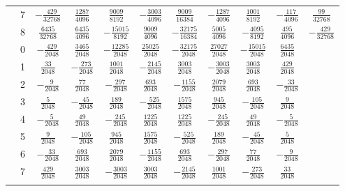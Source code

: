 \begin{table}
\begin{center}
\begin{tabular}{ccccccccccc}
         &  7  &  $-\frac{ 429}{32768}$  &    $ \frac{1287}{4096}$  &  $ \frac{ 9009}{8192}$  &  $-\frac{  3003}{4096}$  & $ \frac{  9009}{16384}$  &  $-\frac{  1287}{ 4096}$  &  $ \frac{  1001}{8192}$  & $-\frac{   117}{ 4096}$  &  $ \frac{    99}{32768}$ \\ \addlinespace
         &  8  &  $ \frac{6435}{32768}$  &    $ \frac{6435}{4096}$  &  $-\frac{15015}{8192}$  &  $ \frac{  9009}{4096}$  & $-\frac{ 32175}{16384}$  &  $ \frac{  5005}{ 4096}$  &  $-\frac{  4095}{8192}$  & $ \frac{   495}{ 4096}$  &  $-\frac{   429}{32768}$ \\ \addlinespace
      8  &  0  &  $-\frac{429}{2048}$  &  $ \frac{3465}{2048}$  &  $-\frac{12285}{2048}$  &  $ \frac{25025}{2048}$  &  $-\frac{32175}{2048}$  &  $ \frac{27027}{2048}$  &  $-\frac{15015}{2048}$  &  $ \frac{6435}{2048}$ \\ \addlinespace
         &  1  &  $ \frac{ 33}{2048}$  &  $-\frac{ 273}{2048}$  &  $ \frac{ 1001}{2048}$  &  $-\frac{ 2145}{2048}$  &  $ \frac{ 3003}{2048}$  &  $-\frac{ 3003}{2048}$  &  $ \frac{ 3003}{2048}$  &  $ \frac{ 429}{2048}$ \\ \addlinespace
         &  2  &  $-\frac{  9}{2048}$  &  $ \frac{  77}{2048}$  &  $-\frac{  297}{2048}$  &  $ \frac{  693}{2048}$  &  $-\frac{ 1155}{2048}$  &  $ \frac{ 2079}{2048}$  &  $ \frac{  693}{2048}$  &  $-\frac{  33}{2048}$ \\ \addlinespace
         &  3  &  $ \frac{  5}{2048}$  &  $-\frac{  45}{2048}$  &  $ \frac{  189}{2048}$  &  $-\frac{  525}{2048}$  &  $ \frac{ 1575}{2048}$  &  $ \frac{  945}{2048}$  &  $-\frac{  105}{2048}$  &  $ \frac{   9}{2048}$ \\ \addlinespace
         &  4  &  $-\frac{  5}{2048}$  &  $ \frac{  49}{2048}$  &  $-\frac{  245}{2048}$  &  $ \frac{ 1225}{2048}$  &  $ \frac{ 1225}{2048}$  &  $-\frac{  245}{2048}$  &  $ \frac{   49}{2048}$  &  $-\frac{   5}{2048}$ \\ \addlinespace
         &  5  &  $ \frac{  9}{2048}$  &  $-\frac{ 105}{2048}$  &  $ \frac{  945}{2048}$  &  $ \frac{ 1575}{2048}$  &  $-\frac{  525}{2048}$  &  $ \frac{  189}{2048}$  &  $-\frac{   45}{2048}$  &  $ \frac{   5}{2048}$ \\ \addlinespace
         &  6  &  $-\frac{ 33}{2048}$  &  $ \frac{ 693}{2048}$  &  $ \frac{ 2079}{2048}$  &  $-\frac{ 1155}{2048}$  &  $ \frac{  693}{2048}$  &  $-\frac{  297}{2048}$  &  $ \frac{   77}{2048}$  &  $-\frac{   9}{2048}$ \\ \addlinespace
         &  7  &  $ \frac{429}{2048}$  &  $ \frac{3003}{2048}$  &  $-\frac{ 3003}{2048}$  &  $ \frac{ 3003}{2048}$  &  $-\frac{ 2145}{2048}$  &  $ \frac{ 1001}{2048}$  &  $-\frac{  273}{2048}$  &  $ \frac{  33}{2048}$ \\ \addlinespace

\end{tabular}
\end{center}
\end{table}
